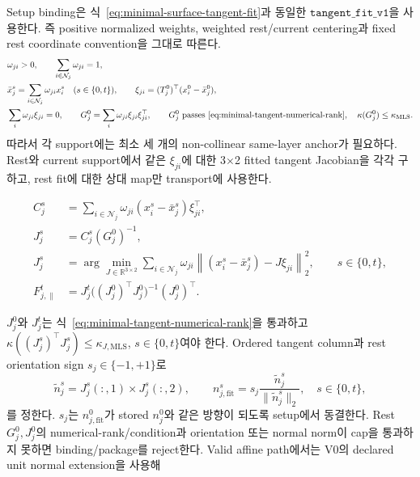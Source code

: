 \documentclass[11pt]{article}
\begin{document}
Setup binding은 식~\eqref{eq:minimal-surface-tangent-fit}과 동일한
\(\texttt{tangent\_fit\_v1}\)을 사용한다.
즉 positive normalized weights, weighted rest/current centering과
fixed rest coordinate convention을 그대로 따른다.
\begin{equation}
\begin{aligned}
  &\omega_{ji}>0,\qquad
  \sum_{i\in\mathcal N_j}\omega_{ji}=1,\\
  &\bar x_j^s=\sum_{i\in\mathcal N_j}\omega_{ji}x_i^s
  \quad(s\in\{0,t\}),\qquad
  \xi_{ji}=(T_j^0)^\top(x_i^0-\bar x_j^0),\\
  &\sum_i\omega_{ji}\xi_{ji}=0,\qquad
  G_j^0=\sum_i\omega_{ji}\xi_{ji}\xi_{ji}^\top,\qquad
  G_j^0\ \text{passes}\ \eqref{eq:minimal-tangent-numerical-rank},\quad
  \kappa(G_j^0)\leq\kappa_{\mathrm{MLS}}.
\end{aligned}
  \label{eq:minimal-affine-weights}
\end{equation}
따라서 각 support에는 최소 세 개의 non-collinear same-layer anchor가 필요하다.
Rest와 current support에서 같은 \(\xi_{ji}\)에 대한 3\(\times\)2 fitted tangent Jacobian을
각각 구하고, rest fit에 대한 상대 map만 transport에 사용한다.

\begin{equation}
\begin{aligned}
  C_j^s
  &=\sum_{i\in\mathcal N_j}\omega_{ji}
    (x_i^s-\bar x_j^s)\xi_{ji}^\top,\\
  J_j^s
  &=C_j^s(G_j^0)^{-1},\\
  J_j^s
  &=\arg\min_{J\in\mathbb R^{3\times2}}
  \sum_{i\in\mathcal N_j}\omega_{ji}
  \left\|(x_i^s-\bar x_j^s)-J\xi_{ji}\right\|_2^2,
  \qquad s\in\{0,t\},\\
  F_{j,\parallel}^t
  &=J_j^t\bigl((J_j^0)^\top J_j^0\bigr)^{-1}(J_j^0)^\top .
\end{aligned}
  \label{eq:minimal-affine-fit}
\end{equation}

\(J_j^0\)와 \(J_j^t\)는 식~\eqref{eq:minimal-tangent-numerical-rank}을 통과하고
\(\kappa((J_j^s)^\top J_j^s)\leq\kappa_{J,\mathrm{MLS}}\),
\(s\in\{0,t\}\)여야 한다.
Ordered tangent column과 rest orientation sign \(s_j\in\{-1,+1\}\)로
\[
  \widetilde n_j^s=J_j^s(:,1)\times J_j^s(:,2),\qquad
  n_{j,\mathrm{fit}}^s
  =s_j\frac{\widetilde n_j^s}{\|\widetilde n_j^s\|_2},
  \quad s\in\{0,t\},
\]
를 정한다. \(s_j\)는 \(n_{j,\mathrm{fit}}^0\)가 stored \(n_j^0\)와 같은 방향이 되도록
setup에서 동결한다. Rest \(G_j^0,J_j^0\)의 numerical-rank/condition과
orientation 또는 normal norm이 cap을
통과하지 못하면 binding/package를 reject한다. Valid affine path에서는 V0의 declared unit normal
extension을 사용해
\end{document}
